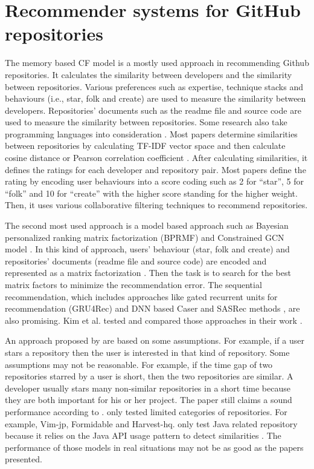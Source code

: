 \documentclass[11pt,twoside]{report}
\begin{document}
\section{Recommender systems for GitHub repositories}
The memory based CF model is a mostly used approach in recommending Github repositories. It calculates the similarity between developers and the similarity between repositories. Various preferences such as expertise, technique stacks and behaviours (i.e., star, folk and create) are used to measure the similarity between developers. Repositories' documents such as the readme file and source code are used to measure the similarity between repositories. Some research also take programming languages into consideration \cite{inka_open_2018, sun_personalized_2018}. Most papers determine similarities between repositories by calculating TF-IDF vector space and then calculate cosine distance or Pearson correlation coefficient \cite{mansur_review_nodate, kim_sequential_2021}. After calculating similarities, it defines the ratings for each developer and repository pair. Most papers define the rating by encoding user behaviours into a score coding such as 2 for “star”, 5 for “folk” and 10 for “create” with the higher score standing for the higher weight. Then, it uses various collaborative filtering techniques to recommend repositories.

The second most used approach is a model based approach such as Bayesian personalized ranking matrix factorization (BPRMF) \cite{jiang_open_2017} and Constrained GCN model \cite{shao_paper2repo_2020}. In this kind of approach, users’ behaviour (star, folk and create) and repositories’ documents (readme file and source code) are encoded and represented as a matrix factorization \cite{jiang_open_2017}. Then the task is to search for the best matrix factors to minimize the recommendation error. The sequential recommendation, which includes approaches like gated recurrent units for recommendation (GRU4Rec) and DNN based Caser and SASRec methods \cite{kim_sequential_2021}, are also promising. Kim et al. \cite{kim_sequential_2021} tested and compared those approaches in their work \cite{kim_sequential_2021}.

An approach proposed by \cite{zhang_detecting_2017} are based on some assumptions. For example, if a user stars a repository then the user is interested in that kind of repository. Some assumptions may not be reasonable. For example, if the time gap of two repositories starred by a user is short, then the two repositories are similar. A developer usually stars many non-similar repositories in a short time because they are both important for his or her project. The paper still claims a sound performance according to \cite{zhang_detecting_2017}. \cite{xu_repersp_2017, sun_personalized_2018, zhang_detecting_2017} only tested limited categories of repositories. For example, Vim-jp, Formidable and Harvest-hq. \cite{sun_personalized_2018} only test Java related repository because it relies on the Java API usage pattern to detect similarities \cite{zhang_detecting_2017}. The performance of those models in real situations may not be as good as the papers presented.
\end{document}
